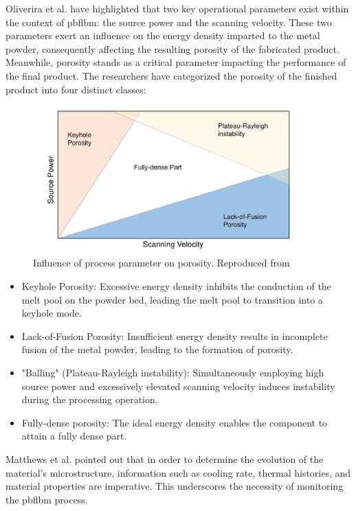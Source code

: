 Oliverira et al. \cite{Oliveira.2020} have highlighted that two key operational parameters 
exist within the context of \gls{pbflbm}: the source power and the 
scanning velocity. These two parameters exert an influence on the energy 
density imparted to the metal powder, consequently affecting the resulting 
porosity of the fabricated product. Meanwhile, porosity stands as a 
critical parameter impacting the performance of the final product. 
The researchers \cite{Oliveira.2020} have categorized the porosity of the 
finished product into four distinct classes:
\begin{figure}[htbp]
    \centering
    \includegraphics[width=0.9\textwidth]{figures/porosity.pdf}
    \caption{Influence of process parameter on porosity. Reproduced from \cite{Oliveira.2020}}
    \label{fig: porosity}
\end{figure}

\begin{itemize}
    \item Keyhole Porosity: Excessive energy density inhibits the conduction 
    of the melt pool on the powder bed, leading the melt pool to transition 
    into a keyhole mode.
    \item Lack-of-Fusion Porosity: Insufficient energy density results in 
    incomplete fusion of the metal powder, leading to the formation of 
    porosity.
    \item "Balling" (Plateau-Rayleigh instability): Simultaneously employing 
    high source power and excessively elevated scanning velocity induces 
    instability during the processing operation.
    \item Fully-dense porosity: The ideal energy density enables the 
    component to attain a fully dense part.
\end{itemize}


Matthews et al. \cite{Matthews.2017} pointed out that in order to determine 
the evolution of the material's microstructure, information such as 
cooling rate, thermal histories, and material properties are imperative. 
This underscores the necessity of monitoring the \gls{pbflbm} process.

